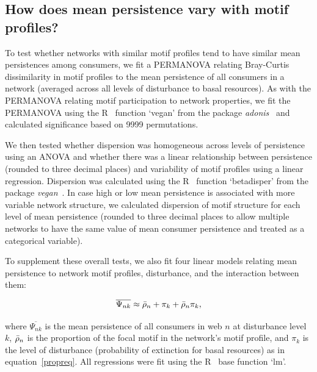 \documentclass[12pt]{article}
\begin{document}
\begin{spacing}{2.0}
    		
    \subsection{How does mean persistence vary with motif profiles?}

        To test whether networks with similar motif profiles tend to have similar mean persistences among consumers, we fit a PERMANOVA relating Bray-Curtis dissimilarity in motif profiles to the mean persistence of all consumers in a network (averaged across all levels of disturbance to basal resources).
        As with the PERMANOVA relating motif participation to network properties, we fit the PERMANOVA using the R~\citep{R} function `vegan' from the package \emph{adonis}~\citep{adonis} and calculated significance based on 9999 permutations.


        We then tested whether dispersion was homogeneous across levels of persistence using an ANOVA and whether there was a linear relationship between persistence (rounded to three decimal places) and variability of motif profiles using a linear regression.
        Dispersion was calculated using the R~\citep{R} function `betadisper' from the package \emph{vegan}~\citep{vegan}.
        In case high or low mean persistence is associated with more variable network structure, we calculated dispersion of motif structure for each level of mean persistence (rounded to three decimal places to allow multiple networks to have the same value of mean consumer persistence and treated as a categorical variable). 

        
        To supplement these overall tests, we also fit four linear models relating mean persistence to network motif profiles, disturbance, and the interaction between them:

            \begin{equation}
                \overline{\Psi_{nk}} \approx \Bar{\rho}_{n} + \pi_{k} + \Bar{\rho}_{n}\pi_{k} ,
                \label{netpropeq}
            \end{equation}
        
        \noindent where $\overline{\Psi_{nk}}$ is the mean persistence of all consumers in web $n$ at disturbance level $k$, $\Bar{\rho}_{n}$ is the proportion of the focal motif in the network's motif profile, and $\pi_k$ is the level of disturbance (probability of extinction for basal resources) as in equation~\ref{propreq}. 
        All regressions were fit using the R~\citep{R} base function `lm'.
    


\end{spacing}
\end{document}
